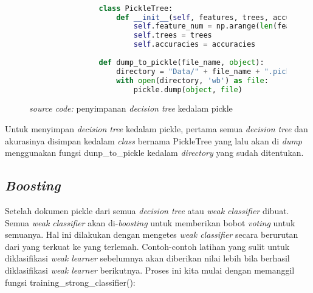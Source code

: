 		\begin{figure}[H]
			\begin{lstlisting}[language=Python, basicstyle=\tiny]

				class PickleTree:
					def __init__(self, features, trees, accuracies):
						self.feature_num = np.arange(len(features))
						self.trees = trees
						self.accuracies = accuracies
					
				def dump_to_pickle(file_name, object):
					directory = "Data/" + file_name + ".pickle"
					with open(directory, 'wb') as file:
						pickle.dump(object, file)
			\end{lstlisting}
			\caption{\emph{source code:} penyimpanan \emph{decision tree} kedalam pickle}
			\label{code: save decision tree}
		\end{figure}

		Untuk menyimpan \emph{decision tree} kedalam pickle, pertama semua \emph{decision tree} 
		dan akurasinya disimpan kedalam \textit{class} bernama PickleTree yang lalu akan di \textit{dump} 
		menggunakan fungsi dunp\_to\_pickle kedalam \textit{directory} yang sudah ditentukan.

	\subsection{\textit{Boosting}}

		Setelah dokumen pickle dari semua \emph{decision tree} atau \emph{weak classifier} 
		dibuat. Semua \emph{weak classifier} akan di-\emph{boosting} untuk memberikan bobot \textit{voting} 
		untuk semuanya. Hal ini dilakukan dengan mengetes \emph{weak classifier} secara berurutan dari 
		yang terkuat ke yang terlemah. Contoh-contoh latihan yang sulit untuk diklasifikasi 
		\emph{weak learner} sebelumnya akan diberikan nilai lebih bila berhasil diklasifikasi 
		\emph{weak learner} berikutnya. Proses ini kita mulai dengan memanggil fungsi 
		training\_strong\_classifier():

